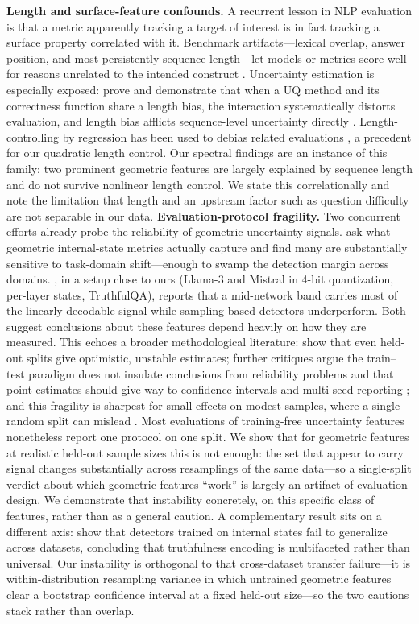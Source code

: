 \documentclass[11pt]{article}
\begin{document}
\textbf{Length and surface-feature confounds.} A recurrent lesson in NLP evaluation is that a metric apparently tracking a target of interest is in fact tracking a surface property correlated with it. Benchmark artifacts---lexical overlap, answer position, and most persistently sequence length---let models or metrics score well for reasons unrelated to the intended construct \citep{sogaard2021random}. Uncertainty estimation is especially exposed: \citet{santilli2025revisiting} prove and demonstrate that when a UQ method and its correctness function share a length bias, the interaction systematically distorts evaluation, and length bias afflicts sequence-level uncertainty directly \citep{gupta2024language}. Length-controlling by regression has been used to debias related evaluations \citep{dubois2024length}, a precedent for our quadratic length control. Our spectral findings are an instance of this family: two prominent geometric features are largely explained by sequence length and do not survive nonlinear length control. We state this correlationally and note the limitation that length and an upstream factor such as question difficulty are not separable in our data.
\textbf{Evaluation-protocol fragility.} Two concurrent efforts already probe the reliability of geometric uncertainty signals. \citet{yeats2025what} ask what geometric internal-state metrics actually capture and find many are substantially sensitive to task-domain shift---enough to swamp the detection margin across domains. \citet{aiersilan2026hallucination}, in a setup close to ours (Llama-3 and Mistral in 4-bit quantization, per-layer states, TruthfulQA), reports that a mid-network band carries most of the linearly decodable signal while sampling-based detectors underperform. Both suggest conclusions about these features depend heavily on how they are measured. This echoes a broader methodological literature: \citet{sogaard2021random} show that even held-out splits give optimistic, unstable estimates; further critiques argue the train--test paradigm does not insulate conclusions from reliability problems and that point estimates should give way to confidence intervals and multi-seed reporting \citep{xue2023reproducibility,riezler2022validity}; and this fragility is sharpest for small effects on modest samples, where a single random split can mislead \citep{an2021radiomics}. Most evaluations of training-free uncertainty features nonetheless report one protocol on one split. We show that for geometric features at realistic held-out sample sizes this is not enough: the set that appear to carry signal changes substantially across resamplings of the same data---so a single-split verdict about which geometric features ``work'' is largely an artifact of evaluation design. We demonstrate that instability concretely, on this specific class of features, rather than as a general caution. A complementary result sits on a different axis: \citet{orgad2025llms} show that detectors trained on internal states fail to generalize across datasets, concluding that truthfulness encoding is multifaceted rather than universal. Our instability is orthogonal to that cross-dataset transfer failure---it is within-distribution resampling variance in which untrained geometric features clear a bootstrap confidence interval at a fixed held-out size---so the two cautions stack rather than overlap.
\end{document}
